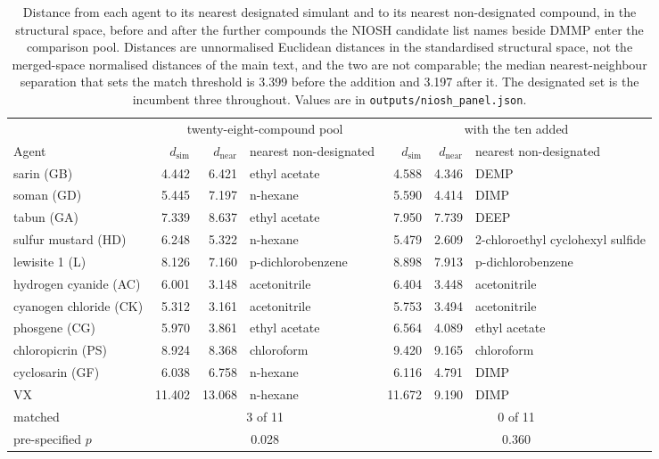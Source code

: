 \begin{table}[htb]
\centering
\caption{Distance from each agent to its nearest designated simulant and to its nearest non-designated compound, in the structural space, before and after the further compounds the NIOSH candidate list names beside DMMP enter the comparison pool. Distances are unnormalised Euclidean distances in the standardised structural space, not the merged-space normalised distances of the main text, and the two are not comparable; the median nearest-neighbour separation that sets the match threshold is 3.399 before the addition and 3.197 after it. The designated set is the incumbent three throughout. Values are in \texttt{outputs/niosh\_panel.json}.}
\label{tab:niosh}
\footnotesize
\setlength{\tabcolsep}{3pt}
\begin{tabular}{lrrlrrl}
\hline
 & \multicolumn{3}{c}{twenty-eight-compound pool} & \multicolumn{3}{c}{with the ten added} \\
\cline{2-4}\cline{5-7}
Agent & $d_{\mathrm{sim}}$ & $d_{\mathrm{near}}$ & nearest non-designated & $d_{\mathrm{sim}}$ & $d_{\mathrm{near}}$ & nearest non-designated \\
\hline
sarin (GB) & 4.442 & 6.421 & ethyl acetate & 4.588 & 4.346 & DEMP \\
soman (GD) & 5.445 & 7.197 & n-hexane & 5.590 & 4.414 & DIMP \\
tabun (GA) & 7.339 & 8.637 & ethyl acetate & 7.950 & 7.739 & DEEP \\
sulfur mustard (HD) & 6.248 & 5.322 & n-hexane & 5.479 & 2.609 & 2-chloroethyl cyclohexyl sulfide \\
lewisite 1 (L) & 8.126 & 7.160 & p-dichlorobenzene & 8.898 & 7.913 & p-dichlorobenzene \\
hydrogen cyanide (AC) & 6.001 & 3.148 & acetonitrile & 6.404 & 3.448 & acetonitrile \\
cyanogen chloride (CK) & 5.312 & 3.161 & acetonitrile & 5.753 & 3.494 & acetonitrile \\
phosgene (CG) & 5.970 & 3.861 & ethyl acetate & 6.564 & 4.089 & ethyl acetate \\
chloropicrin (PS) & 8.924 & 8.368 & chloroform & 9.420 & 9.165 & chloroform \\
cyclosarin (GF) & 6.038 & 6.758 & n-hexane & 6.116 & 4.791 & DIMP \\
VX & 11.402 & 13.068 & n-hexane & 11.672 & 9.190 & DIMP \\
\hline
matched & \multicolumn{3}{c}{3 of 11} & \multicolumn{3}{c}{0 of 11} \\
pre-specified $p$ & \multicolumn{3}{c}{0.028} & \multicolumn{3}{c}{0.360} \\
\hline
\end{tabular}
\end{table}
